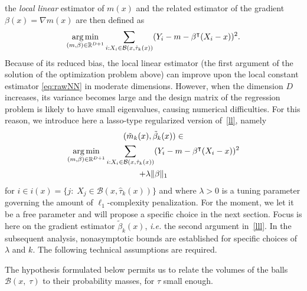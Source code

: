 the \textit{local linear} estimator of $m(x)$ and the related estimator of the gradient $\beta(x)=\nabla m(x)$ are then defined as
\begin{align}
     \argmin_{ (m, \beta) \in \mathbb{R}^{D + 1}} \sum_{i : X_i \in \mathcal{B}(x, \hat{\tau}_k(x))} (Y_i - m - \beta^\intercal (X_i - x))^2 .\label{ll}
\end{align}
Because of its reduced bias, the local linear estimator (the first argument of the solution of the optimization problem above) can improve upon the local constant estimator \eqref{eq:rawNN} in moderate dimensions. However, when the dimension $D$ increases, its variance becomes large and the design matrix of the regression problem is likely to have small eigenvalues, causing numerical difficulties.  For this reason, we introduce here a lasso-type regularized version of~\eqref{ll}, namely
\begin{multline}
    (\tilde m_{k}   (x) , \tilde \beta_k (x)) \in \\
    \argmin_{(m, \beta)\in \mathbb{R}^{D+ 1}} \sum_{i : X_i \in \mathcal{B}(x, \hat{\tau}_k(x))} (Y_i - m - \beta^\intercal (X_i - x))^2 \\ 
    + \lambda \lVert \beta \rVert_1 \label{lll}
\end{multline}
for $i \in i(x) = \{j:\;  X_j \in \mathcal{B}(x, \hat{\tau}_k(x)) \}$ and where $\lambda>0$ is a tuning parameter governing the amount of $\ell_1$-complexity penalization.  For the moment, we let it be a free parameter and will propose a specific choice in the next section. Focus is here on the gradient estimator $\tilde \beta_k (x)$, \textit{i.e.} the second argument in~\eqref{lll}. In the subsequent analysis, nonasymptotic bounds are established for specific choices of $\lambda$ and $k$. The following technical assumptions are required.

 The hypothesis formulated below permits us to relate the volumes of the balls $\mathcal{B}(x,\; \tau)$ to their probability masses, for $\tau$ small enough. 

